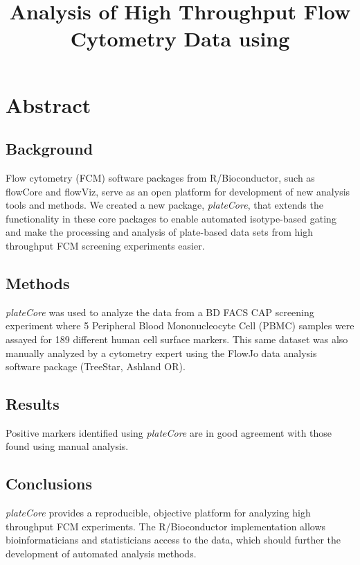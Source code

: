 \documentclass[12pt]{article}
\title{Analysis of High Throughput Flow Cytometry Data using
\Rpackage{plateCore}}
\newcommand{\Rpackage}[1]{{\textit{#1}}}
\begin{document}
\maketitle

\clearpage
\section*{Abstract}
\subsection*{Background}
Flow cytometry (FCM) software packages from R/Bioconductor, such as flowCore
and flowViz, serve as an open platform for development of new analysis tools and
methods. We created a new package, \Rpackage{plateCore}, that extends the
functionality in these core packages to enable automated isotype-based gating
and make the processing and analysis of plate-based data sets from
high throughput FCM screening experiments easier.

\subsection*{Methods}
\Rpackage{plateCore} was used to analyze the data from a BD FACS CAP screening
experiment where 5 Peripheral Blood Mononucleocyte Cell (PBMC) samples  were
assayed for 189 different human cell surface markers. This same dataset was
also manually analyzed by a cytometry expert using the FlowJo data analysis
software package (TreeStar, Ashland OR).

\subsection*{Results}
Positive markers identified using \Rpackage{plateCore} are in good agreement
with those found using manual analysis.

\subsection*{Conclusions}
\Rpackage{plateCore} provides a reproducible, objective platform for analyzing
high throughput FCM experiments. The R/Bioconductor implementation allows
bioinformaticians and statisticians access to the data, which should further
the development of automated analysis methods.

\clearpage
\end{document}
